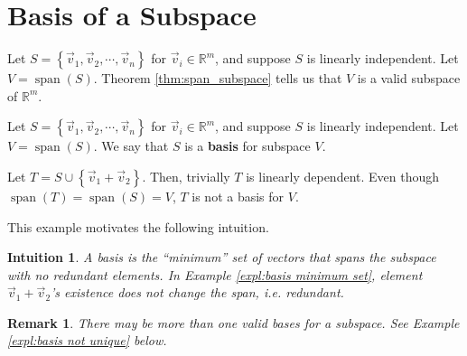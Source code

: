 \documentclass[]{book}
\DeclareMathOperator{\vecspan}{span}
\newcommand{\vecn}[1]{\ensuremath{\vec{v}_{#1}}}
\newtheorem*{intuition}{Intuition}
\newtheorem*{remark}{Remark}
\begin{document}
\section{Basis of a Subspace}
Let $S=\left\{\vecn{1}, \vecn{2}, \cdots, \vecn{n}\right\}$ for $\vecn{i} \in \mathbb{R}^m$, and suppose $S$ is linearly independent. Let $V=\vecspan(S)$. Theorem \ref{thm:span_subspace} tells us that $V$ is a valid subspace of $\mathbb{R}^m$.
\begin{definition}
    Let $S=\left\{\vecn{1}, \vecn{2}, \cdots, \vecn{n}\right\}$ for $\vecn{i} \in \mathbb{R}^m$, and suppose $S$ is linearly independent. Let $V=\vecspan(S)$. We say that $S$ is a \textbf{basis} for subspace $V$.
\end{definition}
\begin{example}
    \label{expl:basis minimum set}
    Let $T=S \cup \left\{\vecn{1} + \vecn{2}\right\}$. Then, trivially $T$ is linearly dependent. Even though $\vecspan(T)=\vecspan(S)=V$, $T$ is not a basis for $V$. \hfill \qedsymbol
\end{example}
This example motivates the following intuition.
\begin{intuition}
    A basis is the ``minimum'' set of vectors that spans the subspace with no redundant elements. In Example \ref{expl:basis minimum set}, element $\vecn{1} + \vecn{2}$'s existence does not change the span, i.e. redundant.
\end{intuition}
\begin{remark}
    There may be more than one valid bases for a subspace. See Example \ref{expl:basis not unique} below.
\end{remark}
\end{document}
